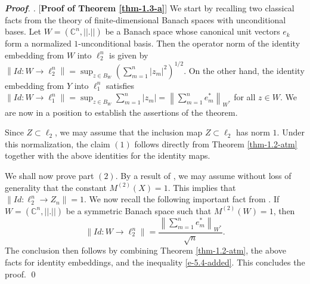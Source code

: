 \documentclass[a4paper,11pt, reqno]{amsart}
\theoremstyle{definition}
\newenvironment{pf}[1][]{%
	\vskip 3mm
	\noindent
	\ifthenelse{\equal{#1}{}}%
	{{\slshape {\bf Proof}. }}%
	{{\slshape #1.} }%
}%
{\qed\bigskip}
\newcommand{\norm}[1]{\left\lVert#1\right\rVert}
\begin{document}
\begin{pf} [{\bf Proof of Theorem \ref{thm-1.3-a}}]
	We start by recalling two classical facts from the theory of finite-dimensional Banach spaces with unconditional bases. Let $W=(\mathbb{C}^n, ||.||)$ be a Banach space whose canonical unit vectors $e_{k}$ form a normalized $1$-unconditional basis. Then the operator norm of the identity embedding from $W$ into $\ell^n_2$ is given by $\norm{Id: W \rightarrow \ell_2^n}=\sup_{z \in B_{W}}(\sum_{m=1}^{n}|z_{m}|^2)^{1/2}$. On the other hand, the identity embedding from $Y$ into $\ell^n_1$ satisfies  $\norm{Id: W \rightarrow \ell_1^n}=\sup_{z \in B_{W}} \sum_{m=1}^{n}|z_{m}|=\norm{\sum_{m=1}^{n}e^{*}_{m}}_{W^{*}}$ for all $z \in W$. We are now in a position to establish the assertions of the theorem.
	\vspace{1mm}
	
	Since $Z \subset \ell_2$, we may assume that the inclusion map $Z \subset \ell_2$ has norm $1$. Under this normalization, the claim $(1)$ follows directly from Theorem \ref{thm-1.2-atm} together with the above identities for the identity maps.
	\vspace{1mm}
	
	We shall now prove part $(2)$. By a result of \cite[Theorem 1.d.5]{Lindenstrauss-book}, we may assume without loss of generality that the constant $M^{(2)}(X)=1$. This implies that $\norm{Id: \ell_2^n \rightarrow Z_{n}}=1$. We now recall the following important fact from  \cite[(5.3), p. 191]{defant-2003}. If $W=(\mathbb{C}^n, ||.||)$ be a symmetric Banach space such that $M^{(2)}(W)=1$, then 
	\begin{equation} \label{e-5.4-added}
	\norm{Id: W \rightarrow \ell^n_2}= \frac{\norm{\sum_{m=1}^{n}e^{*}_{m}}_{W^{*}}}{\sqrt{n}}.
	\end{equation}
	 The conclusion then follows by combining Theorem \ref{thm-1.2-atm}, the above facts for identity embeddings, and the inequality \eqref{e-5.4-added}. This concludes the proof.	
\end{pf}
\end{document}

